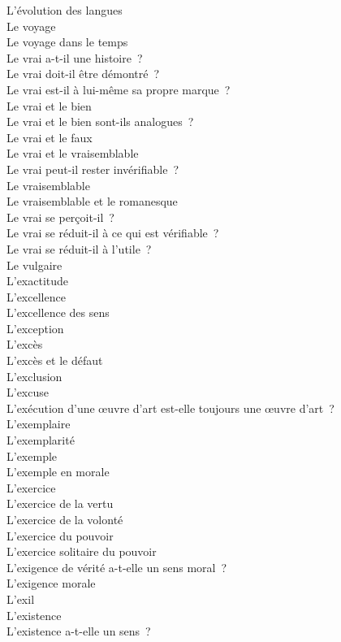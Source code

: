 \documentclass[a4paper,12pt]{article}
\begin{document}
L'évolution des langues \\
Le voyage \\
Le voyage dans le temps \\
Le vrai a-t-il une histoire ? \\
Le vrai doit-il être démontré ? \\
Le vrai est-il à lui-même sa propre marque ? \\
Le vrai et le bien \\
Le vrai et le bien sont-ils analogues ? \\
Le vrai et le faux \\
Le vrai et le vraisemblable \\
Le vrai peut-il rester invérifiable ? \\
Le vraisemblable \\
Le vraisemblable et le romanesque \\
Le vrai se perçoit-il ? \\
Le vrai se réduit-il à ce qui est vérifiable ? \\
Le vrai se réduit-il à l'utile ? \\
Le vulgaire \\
L'exactitude \\
L'excellence \\
L'excellence des sens \\
L'exception \\
L'excès \\
L'excès et le défaut \\
L'exclusion \\
L'excuse \\
L'exécution d'une œuvre d'art est-elle toujours une œuvre d'art ? \\
L'exemplaire \\
L'exemplarité \\
L'exemple \\
L'exemple en morale \\
L'exercice \\
L'exercice de la vertu \\
L'exercice de la volonté \\
L'exercice du pouvoir \\
L'exercice solitaire du pouvoir \\
L'exigence de vérité a-t-elle un sens moral ? \\
L'exigence morale \\
L'exil \\
L'existence \\
L'existence a-t-elle un sens ? \\
\end{document}
